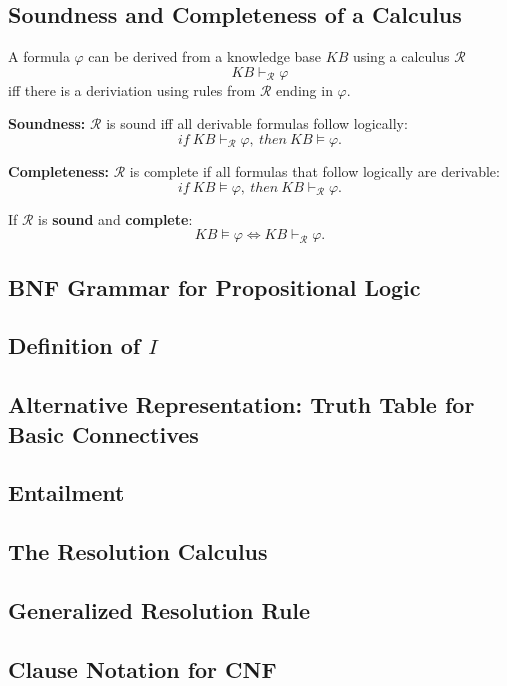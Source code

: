 \documentclass[conference, a4paper]{styles/acmsiggraph}
\begin{document}
    
    \subsection{Soundness and Completeness of a Calculus}
        A formula $\varphi$ can be derived from a knowledge base $KB$ using a calculus $\mathcal{R}$
            $$KB \vdash_{\mathcal{R}} \varphi$$
        iff there is a deriviation using rules from $\mathcal{R}$ ending in $\varphi$.\newline
        
        \textbf{Soundness:} $\mathcal{R}$ is sound iff all derivable formulas follow logically:
            $$if \  KB \vdash_{\mathcal{R}} \varphi, \  then \  KB \vDash \varphi.$$
        
        \textbf{Completeness:} $\mathcal{R}$ is complete if all formulas that follow logically are derivable:
            $$if \  KB \vDash \varphi, \  then \  KB \vdash_{\mathcal{R}} \varphi.$$
        
        If $\mathcal{R}$ is \textbf{sound} and \textbf{complete}:
            $$KB \vDash \varphi \Leftrightarrow KB \vdash_{\mathcal{R}} \varphi.$$
    
    \subsection{BNF Grammar for Propositional Logic}
    \subsection{Definition of $I$}
    \subsection{Alternative Representation: Truth Table for Basic Connectives}
    \subsection{Entailment}
    \subsection{The Resolution Calculus}
    \subsection{Generalized Resolution Rule}
    \subsection{Clause Notation for CNF}
\end{document}
